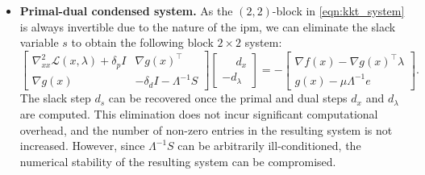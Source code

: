 \documentclass{article}
\begin{document}
\begin{itemize}[leftmargin=*,itemsep=0pt,parsep=0pt,partopsep=0pt]
\item \textbf{Primal-dual condensed system.}
As the $(2,2)$-block in \cref{eqn:kkt_system} is always invertible due to the nature of the \gls*{ipm}, we can eliminate the slack variable $s$ to obtain the following block $2\times 2$ system:
\begin{equation}\label{eqn:augmentedKKT}
  \begin{bmatrix}
    \nabla^2_{x x} \mathcal{L}(x,\lambda) + \delta_p I & \nabla g(x)^\top \\
    \nabla g(x) &  - \delta_d I - \Lambda^{-1} S
  \end{bmatrix}
  \begin{bmatrix}
    \phantom{-}d_x\\
    - d_\lambda
  \end{bmatrix} =
  -\begin{bmatrix}
    \nabla f(x) - \nabla g(x)^\top \lambda\\
    g(x) - \mu \Lambda^{-1} e
  \end{bmatrix}.
\end{equation}
The slack step $d_s$ can be recovered once the primal and dual steps $d_x$ and $d_\lambda$ are computed. This elimination does not incur significant computational overhead, and the number of non-zero entries in the resulting system is not increased. However, since $\Lambda^{-1} S$ can be arbitrarily ill-conditioned, the numerical stability of the resulting system can be compromised.


\end{itemize}
\end{document}
